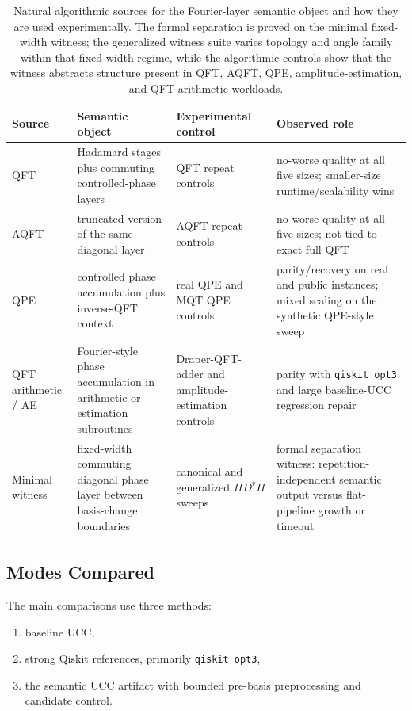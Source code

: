 \documentclass[11pt]{article}
\begin{document}
\begin{table}[t]
\centering
\scriptsize
\begin{tabular}{@{}>{\raggedright\arraybackslash}p{}
                >{\raggedright\arraybackslash}p{}
                >{\raggedright\arraybackslash}p{}
                >{\raggedright\arraybackslash}p{}@{}}
\toprule
Source & Semantic object & Experimental control & Observed role \\
\midrule
QFT & Hadamard stages plus commuting controlled-phase layers
& QFT repeat controls
& no-worse quality at all five sizes; smaller-size runtime/scalability wins \\
AQFT & truncated version of the same diagonal layer
& AQFT repeat controls
& no-worse quality at all five sizes; not tied to exact full QFT \\
QPE & controlled phase accumulation plus inverse-QFT context
& real QPE and MQT QPE controls
& parity/recovery on real and public instances; mixed scaling on the synthetic QPE-style sweep \\
QFT arithmetic / AE & Fourier-style phase accumulation in arithmetic or estimation subroutines
& Draper-QFT-adder and amplitude-estimation controls
& parity with \texttt{qiskit opt3} and large baseline-UCC regression repair \\
Minimal witness & fixed-width commuting diagonal phase layer between basis-change boundaries
& canonical and generalized $H D^r H$ sweeps
& formal separation witness: repetition-independent semantic output versus flat-pipeline growth or timeout \\
\bottomrule
\end{tabular}
\caption{Natural algorithmic sources for the Fourier-layer semantic object and how they are used experimentally. The formal separation is proved on the minimal fixed-width witness; the generalized witness suite varies topology and angle family within that fixed-width regime, while the algorithmic controls show that the witness abstracts structure present in QFT, AQFT, QPE, amplitude-estimation, and QFT-arithmetic workloads.}
\label{tab:natural-sources}
\end{table}

\subsection{Modes Compared}

The main comparisons use three methods:
\begin{enumerate}[leftmargin=1.5em]
    \item baseline UCC,
    \item strong Qiskit references, primarily \texttt{qiskit opt3},
    \item the semantic UCC artifact with bounded pre-basis preprocessing and candidate control.
\end{enumerate}
\end{document}
